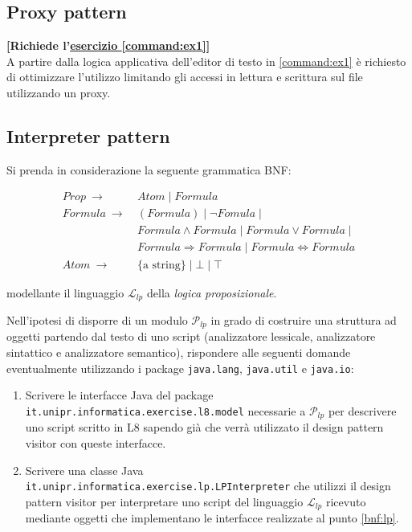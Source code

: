 \documentclass[12pt,a4paper]{article}
\begin{document}
    \subsection{Proxy pattern}\label{pattern:proxy}
    \begin{Exercise}
    \small\textbf{[Richiede l'\hyperref[command:ex1]{esercizio \ref{command:ex1}}]}\\
    A partire dalla logica applicativa dell'editor di testo in \hyperref[command:ex1]{\ref{command:ex1}} è richiesto di ottimizzare l'utilizzo limitando gli accessi in lettura e scrittura sul file utilizzando un proxy.
    \end{Exercise}
    

    
    \subsection{Interpreter pattern}\label{pattern:interpreter}
	\newcommand{\alt}[0]{{\;|\;}}    
    
    \begin{Exercise}
    Si prenda in considerazione la seguente grammatica BNF:
    
	\begin{align*}
	Prop \:\longrightarrow\: &Atom \alt Formula \\
	Formula \:\longrightarrow\: &(Formula) \alt \lnot Fomula \alt\\
			 & Formula \land Formula \alt Formula \lor Formula \alt\\
			 & Formula \Rightarrow Formula \alt Formula \Leftrightarrow Formula \\
	Atom \:\longrightarrow\: &\text{\{a string\}} \alt \bot \alt \top
	\end{align*}
	
	modellante il linguaggio $\mathcal{L}_{lp}$ della \textit{logica proposizionale}.
	
	Nell’ipotesi di disporre di un modulo $\mathcal{P}_{lp}$ in grado di
	costruire una struttura ad oggetti partendo dal testo di uno script
	(analizzatore lessicale, analizzatore sintattico e analizzatore 
	semantico),	rispondere alle seguenti domande eventualmente utilizzando 
	i package \texttt{java.lang}, \texttt{java.util} e \texttt{java.io}:
	
	\begin{enumerate}
	\item\label{bnf:lp} Scrivere le interfacce Java del package
		\texttt{it.unipr.informatica.exercise.l8.model} necessarie a 
		$\mathcal{P}_{lp}$ per 
		descrivere uno script scritto in L8 sapendo già che verrà utilizzato 
		il design pattern visitor con queste interfacce.
	
	\item Scrivere una classe Java \texttt{it.unipr.informatica.exercise.lp.LPInterpreter} che utilizzi il
design pattern visitor per interpretare uno script del linguaggio $\mathcal{L}_{lp}$ ricevuto mediante oggetti che implementano le interfacce realizzate al punto \ref{bnf:lp}.
	\end{enumerate}
    
    \end{Exercise}
\end{document}
